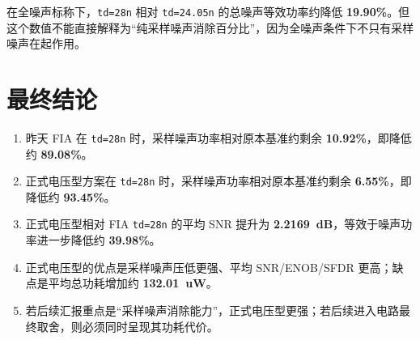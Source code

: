 \documentclass[12pt,a4paper]{ctexart}
\begin{document}
在全噪声标称下，\texttt{td=28n} 相对 \texttt{td=24.05n} 的总噪声等效功率约降低 \textbf{19.90\%}。但这个数值不能直接解释为“纯采样噪声消除百分比”，因为全噪声条件下不只有采样噪声在起作用。

\section{最终结论}

\begin{enumerate}
  \item 昨天 FIA 在 \texttt{td=28n} 时，采样噪声功率相对原本基准约剩余 \textbf{10.92\%}，即降低约 \textbf{89.08\%}。
  \item 正式电压型方案在 \texttt{td=28n} 时，采样噪声功率相对原本基准约剩余 \textbf{6.55\%}，即降低约 \textbf{93.45\%}。
  \item 正式电压型相对 FIA \texttt{td=28n} 的平均 SNR 提升为 \textbf{\SI{2.2169}{dB}}，等效于噪声功率进一步降低约 \textbf{39.98\%}。
  \item 正式电压型的优点是采样噪声压低更强、平均 SNR/ENOB/SFDR 更高；缺点是平均总功耗增加约 \textbf{\SI{132.01}{uW}}。
  \item 若后续汇报重点是“采样噪声消除能力”，正式电压型更强；若后续进入电路最终取舍，则必须同时呈现其功耗代价。
\end{enumerate}
\end{document}

